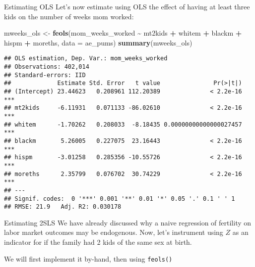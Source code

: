 \documentclass[
  ignorenonframetext,
]{beamer}
\newenvironment{Shaded}{\begin{snugshade}}{\end{snugshade}}
\newcommand{\AttributeTok}[1]{\textcolor[rgb]{0.13,0.29,0.53}{#1}}
\newcommand{\FunctionTok}[1]{\textcolor[rgb]{0.13,0.29,0.53}{\textbf{#1}}}
\newcommand{\NormalTok}[1]{#1}
\newcommand{\OtherTok}[1]{\textcolor[rgb]{0.56,0.35,0.01}{#1}}
\newcommand{\SpecialCharTok}[1]{\textcolor[rgb]{0.81,0.36,0.00}{\textbf{#1}}}
\begin{document}
\begin{frame}[fragile]{Estimating OLS}
\label{estimating-ols-1}
Let's now estimate using OLS the effect of having at least three kids on
the number of weeks mom worked:

\tiny

\begin{Shaded}
\begin{Highlighting}[]
\NormalTok{mweeks\_ols }\OtherTok{\textless{}{-}} \FunctionTok{feols}\NormalTok{(mom\_weeks\_worked }\SpecialCharTok{\textasciitilde{}}\NormalTok{ mt2kids }\SpecialCharTok{+}\NormalTok{ whitem }\SpecialCharTok{+}\NormalTok{ blackm }\SpecialCharTok{+}\NormalTok{ hispm }\SpecialCharTok{+}\NormalTok{ moreths, }
                     \AttributeTok{data =}\NormalTok{ ae\_pums)}
\FunctionTok{summary}\NormalTok{(mweeks\_ols)}
\end{Highlighting}
\end{Shaded}

\begin{verbatim}
## OLS estimation, Dep. Var.: mom_weeks_worked
## Observations: 402,014
## Standard-errors: IID 
##             Estimate Std. Error   t value               Pr(>|t|)    
## (Intercept) 23.44623   0.208961 112.20389              < 2.2e-16 ***
## mt2kids     -6.11931   0.071133 -86.02610              < 2.2e-16 ***
## whitem      -1.70262   0.208033  -8.18435 0.00000000000000027457 ***
## blackm       5.26005   0.227075  23.16443              < 2.2e-16 ***
## hispm       -3.01258   0.285356 -10.55726              < 2.2e-16 ***
## moreths      2.35799   0.076702  30.74229              < 2.2e-16 ***
## ---
## Signif. codes:  0 '***' 0.001 '**' 0.01 '*' 0.05 '.' 0.1 ' ' 1
## RMSE: 21.9   Adj. R2: 0.030178
\end{verbatim}
\end{frame}

\begin{frame}[fragile]{Estimating 2SLS}
\label{estimating-2sls}
We have already discussed why a naive regression of fertility on labor
market outcomes may be endogenous. Now, let's instrument using \(Z\) as
an indicator for if the family had 2 kids of the same sex at birth.

We will first implement it by-hand, then using \texttt{feols()}
\end{frame}
\end{document}
